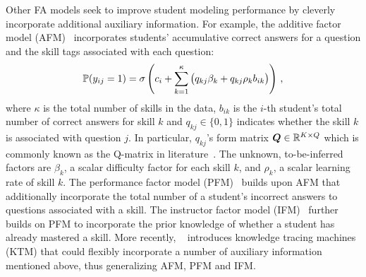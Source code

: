 \documentclass{edm_article}
\begin{document}
Other FA models seek to improve student modeling performance by cleverly incorporate additional auxiliary information. 
For example, the additive factor model (AFM)~\cite{LFA} incorporates students' accumulative correct answers for a question and the skill tags associated with each question:
\begin{align}
    \begin{split}
        \mathbb{P}(y_{ij}=1) = \sigma\left(c_i + \sum_{k=1}^\kappa\big( q_{kj}\beta_k + q_{kj}\rho_k b_{ik} \big)\right)\,,\label{eq:laf}
    \end{split}
\end{align}
where $\kappa$ is the total number of skills in the data, $b_{ik}$ is the $i$-th student's total number of correct answers for skill $k$ and $q_{kj}\in\{0,1\}$ indicates whether the skill $k$ is associated with question $j$. In particular, $q_{kj}$'s form matrix ${\bm{Q}}\in\mathbb{R}^{K\times Q}$ which is commonly known as the Q-matrix in literature~\cite{qmatrix}. The unknown, to-be-inferred factors are $\beta_k$, a scalar difficulty factor for each skill $k$, and $\rho_k$, a scalar learning rate of skill $k$.
%
The performance factor model (PFM)~\cite{PFA} builds upon AFM that additionally incorporate the total number of a student's incorrect answers to questions associated with a skill. The instructor factor model (IFM)~\cite{chi2011instructional} further builds on PFM to incorporate the prior knowledge of whether a student has already mastered a skill. More recently, ~\cite{vie2019knowledge} introduces knowledge tracing machines (KTM) that could flexibly incorporate a number of auxiliary information mentioned above, thus generalizing AFM, PFM and IFM. 
\end{document}

